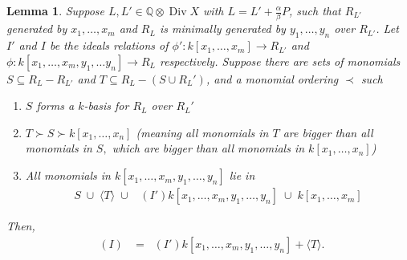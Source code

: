 \documentclass{amsart}
\theoremstyle{plain}
\newtheorem{lem}[thm]{Lemma}
\theoremstyle{definition}
\theoremstyle{remark}
\numberwithin{equation}{section}
\newcommand\BQ{{\mathbb Q}}
\DeclareMathOperator\di{Div}
\newcommand{\halfcan}{L}
\DeclareMathOperator{\initial}{in_\prec}
\begin{document}
\begin{lem}\label{lem:relations_from_generators_induction} 
Suppose $\halfcan, \halfcan' \in \BQ \otimes \di X$ with $\halfcan=\halfcan'+\frac{\alpha}{\beta}P$, such that $R_{\halfcan'}$ generated by $x_1, \ldots, x_m$
and $R_{\halfcan}$ is minimally generated by $y_1, \ldots, y_n$ over 
$R_{\halfcan'}$.  Let $I'$ and $I$ be the ideals relations of $\phi':k[x_1, \ldots, x_m]\to R_{\halfcan'}$ and $\phi:k[x_1, \ldots, x_m, y_1, \ldots y_n]\to R_{\halfcan}$ respectively.
Suppose there are sets of monomials $S\subseteq R_\halfcan-R_{\halfcan'}$ and $T\subseteq R_\halfcan-(S\cup R_\halfcan')$, and a monomial ordering $\prec$ such 
\begin{enumerate}
\item $S$ forms a $k$-basis for $R_\halfcan$ over $R_\halfcan'$
\item $T\succ S\succ k[x_1, \ldots, x_n]$ {\rm(}meaning all monomials in $T$ are bigger than all monomials in $S,$ which are bigger than all monomials in $k[x_1, \ldots, x_n]${\rm)}
\item All monomials in $k[x_1, \ldots, x_m, y_1, \ldots, y_n]$ lie in 
\begin{align*}
	S \; \cup\; \langle T\rangle \; \cup \; \initial(I') k[x_1, \ldots, x_m, y_1, \ldots, y_n] \; \cup \; k[x_1, \ldots, x_m]
\end{align*}
\end{enumerate}
Then,
\begin{align*}
	\initial(I) & = \initial(I') k[x_1, \ldots, x_m, y_1, \ldots, y_n]
	+ \langle T \rangle.
\end{align*}
\end{lem}
\end{document}

